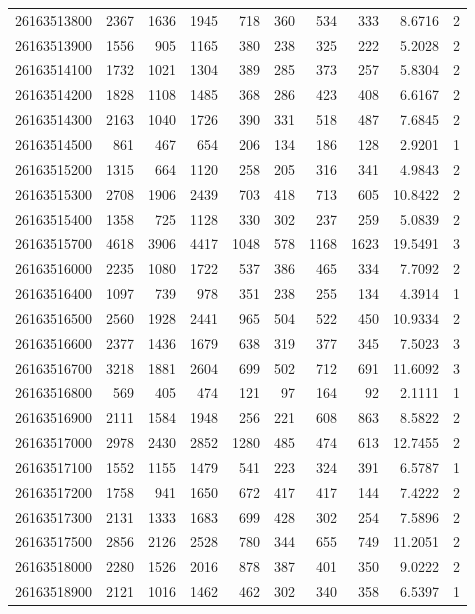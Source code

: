 \documentclass[11pt,landscape]{article}
\begin{document}
{\begin{longtable}[]{@{}lrrrrrrrrr@{}}
26163513800 & 2367 & 1636 & 1945 & 718 & 360 & 534 & 333 & 8.6716 & 2 \\
26163513900 & 1556 & 905 & 1165 & 380 & 238 & 325 & 222 & 5.2028 & 2 \\
26163514100 & 1732 & 1021 & 1304 & 389 & 285 & 373 & 257 & 5.8304 & 2 \\
26163514200 & 1828 & 1108 & 1485 & 368 & 286 & 423 & 408 & 6.6167 & 2 \\
26163514300 & 2163 & 1040 & 1726 & 390 & 331 & 518 & 487 & 7.6845 & 2 \\
26163514500 & 861 & 467 & 654 & 206 & 134 & 186 & 128 & 2.9201 & 1 \\
26163515200 & 1315 & 664 & 1120 & 258 & 205 & 316 & 341 & 4.9843 & 2 \\
26163515300 & 2708 & 1906 & 2439 & 703 & 418 & 713 & 605 & 10.8422 & 2 \\
26163515400 & 1358 & 725 & 1128 & 330 & 302 & 237 & 259 & 5.0839 & 2 \\
26163515700 & 4618 & 3906 & 4417 & 1048 & 578 & 1168 & 1623 & 19.5491 & 3 \\
26163516000 & 2235 & 1080 & 1722 & 537 & 386 & 465 & 334 & 7.7092 & 2 \\
26163516400 & 1097 & 739 & 978 & 351 & 238 & 255 & 134 & 4.3914 & 1 \\
26163516500 & 2560 & 1928 & 2441 & 965 & 504 & 522 & 450 & 10.9334 & 2 \\
26163516600 & 2377 & 1436 & 1679 & 638 & 319 & 377 & 345 & 7.5023 & 3 \\
26163516700 & 3218 & 1881 & 2604 & 699 & 502 & 712 & 691 & 11.6092 & 3 \\
26163516800 & 569 & 405 & 474 & 121 & 97 & 164 & 92 & 2.1111 & 1 \\
26163516900 & 2111 & 1584 & 1948 & 256 & 221 & 608 & 863 & 8.5822 & 2 \\
26163517000 & 2978 & 2430 & 2852 & 1280 & 485 & 474 & 613 & 12.7455 & 2 \\
26163517100 & 1552 & 1155 & 1479 & 541 & 223 & 324 & 391 & 6.5787 & 1 \\
26163517200 & 1758 & 941 & 1650 & 672 & 417 & 417 & 144 & 7.4222 & 2 \\
26163517300 & 2131 & 1333 & 1683 & 699 & 428 & 302 & 254 & 7.5896 & 2 \\
26163517500 & 2856 & 2126 & 2528 & 780 & 344 & 655 & 749 & 11.2051 & 2 \\
26163518000 & 2280 & 1526 & 2016 & 878 & 387 & 401 & 350 & 9.0222 & 2 \\
26163518900 & 2121 & 1016 & 1462 & 462 & 302 & 340 & 358 & 6.5397 & 1 \\

\end{longtable}}
\end{document}
